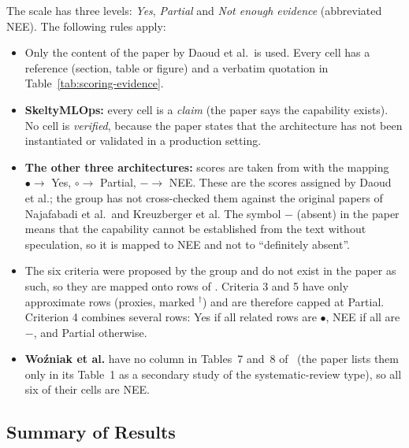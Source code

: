 \documentclass[11pt,a4paper]{article}
\begin{document}
The scale has three levels: \emph{Yes}, \emph{Partial} and \emph{Not enough evidence} (abbreviated NEE). The following rules apply:

\begin{itemize}
  \item Only the content of the paper by Daoud et al.\ is used. Every cell has a reference (section, table or figure) and a verbatim quotation in Table~\ref{tab:scoring-evidence}.
  \item \textbf{SkeltyMLOps:} every cell is a \emph{claim} (the paper says the capability exists). No cell is \emph{verified}, because the paper states that the architecture has not been instantiated or validated in a production setting.
  \item \textbf{The other three architectures:} scores are taken from  with the mapping $\bullet \rightarrow$ Yes, $\circ \rightarrow$ Partial, $- \rightarrow$ NEE. These are the scores assigned by Daoud et al.; the group has not cross-checked them against the original papers of Najafabadi et al.\ and Kreuzberger et al. The symbol $-$ (absent) in the paper means that the capability cannot be established from the text without speculation, so it is mapped to NEE and not to ``definitely absent''.
  \item The six criteria were proposed by the group and do not exist in the paper as such, so they are mapped onto rows of . Criteria 3 and 5 have only approximate rows (proxies, marked $^{\dagger}$) and are therefore capped at Partial. Criterion 4 combines several rows: Yes if all related rows are $\bullet$, NEE if all are $-$, and Partial otherwise.
  \item \textbf{Wo\'{z}niak et al.} have no column in Tables~7 and~8 of~\papercite{} (the paper lists them only in its Table~1 as a secondary study of the systematic-review type), so all six of their cells are NEE.
\end{itemize}

\subsection{Summary of Results}
\end{document}

